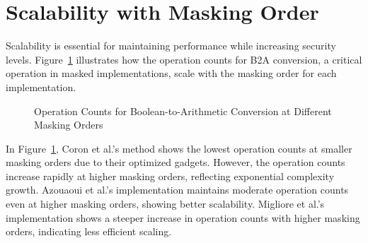\section{Scalability with Masking Order}

Scalability is essential for maintaining performance while increasing security levels. Figure~\ref{fig:b2a_comparison} illustrates how the operation counts for \ac{B2A} conversion, a critical operation in masked implementations, scale with the masking order for each implementation.

\begin{figure}[h]
    \centering
    \caption{Operation Counts for Boolean-to-Arithmetic Conversion at Different Masking Orders}
    \label{fig:b2a_comparison}
\end{figure}

In Figure~\ref{fig:b2a_comparison}, Coron et al.'s method shows the lowest operation counts at smaller masking orders due to their optimized gadgets. However, the operation counts increase rapidly at higher masking orders, reflecting exponential complexity growth. Azouaoui et al.'s implementation maintains moderate operation counts even at higher masking orders, showing better scalability. Migliore et al.'s implementation shows a steeper increase in operation counts with higher masking orders, indicating less efficient scaling.

